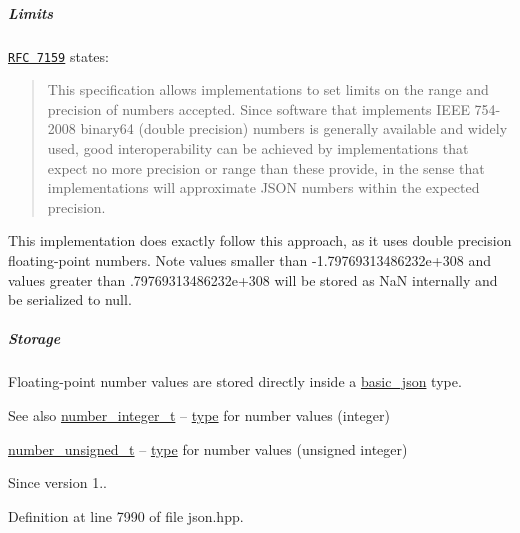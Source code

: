 \subparagraph*{Limits}

\href{http://rfc7159.net/rfc7159}{\tt R\+FC 7159} states\+: \begin{quote}
This specification allows implementations to set limits on the range and precision of numbers accepted. Since software that implements I\+E\+EE 754-\/2008 binary64 (double precision) numbers is generally available and widely used, good interoperability can be achieved by implementations that expect no more precision or range than these provide, in the sense that implementations will approximate J\+S\+ON numbers within the expected precision. \end{quote}


This implementation does exactly follow this approach, as it uses double precision floating-\/point numbers. Note values smaller than {\ttfamily -\/1.\+79769313486232e+308} and values greater than {.\+79769313486232e+308} will be stored as NaN internally and be serialized to {\ttfamily null}.

\subparagraph*{Storage}

Floating-\/point number values are stored directly inside a \hyperlink{classnlohmann_1_1basic__json}{basic\+\_\+json} type.

\begin{DoxySeeAlso}{See also}
\hyperlink{classnlohmann_1_1basic__json_a98e611d67b7bd75307de99c9358ab2dc}{number\+\_\+integer\+\_\+t} -- \hyperlink{classnlohmann_1_1basic__json_a2b2d781d7f2a4ee41bc0016e931cadf7}{type} for number values (integer)

\hyperlink{classnlohmann_1_1basic__json_ab906e29b5d83ac162e823ada2156b989}{number\+\_\+unsigned\+\_\+t} -- \hyperlink{classnlohmann_1_1basic__json_a2b2d781d7f2a4ee41bc0016e931cadf7}{type} for number values (unsigned integer)
\end{DoxySeeAlso}
\begin{DoxySince}{Since}
version 1.. 
\end{DoxySince}


Definition at line 7990 of file json.\+hpp.

